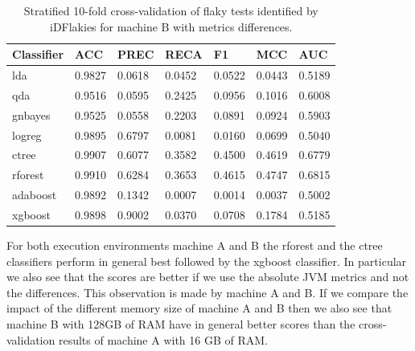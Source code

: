 \documentclass{seal_thesis}
\begin{document}
\begin{table}[ht]
\centering
\begin{tabular}{|l|l|l|l|l|l|l|}
\hline
\textbf{Classifier} & \textbf{ACC} & \textbf{PREC} & \textbf{RECA} & \textbf{F1} & \textbf{MCC} & \textbf{AUC} \\ \hline
  lda & 0.9827 & 0.0618 & 0.0452 & 0.0522 & 0.0443 & 0.5189 \\ \hline
  qda & 0.9516 & 0.0595 & 0.2425 & 0.0956 & 0.1016 & 0.6008 \\ \hline
  gnbayes & 0.9525 & 0.0558 & 0.2203 & 0.0891 & 0.0924 & 0.5903 \\ \hline
  logreg & 0.9895 & 0.6797 & 0.0081 & 0.0160 & 0.0699 & 0.5040 \\ \hline
  ctree & 0.9907 & 0.6077 & 0.3582 & 0.4500 & 0.4619 & 0.6779 \\ \hline
  rforest & 0.9910 & 0.6284 & 0.3653 & 0.4615 & 0.4747 & 0.6815 \\ \hline
  adaboost & 0.9892 & 0.1342 & 0.0007 & 0.0014 & 0.0037 & 0.5002 \\ \hline
  xgboost & 0.9898 & 0.9002 & 0.0370 & 0.0708 & 0.1784 & 0.5185 \\ \hline
\end{tabular}
\caption{Stratified 10-fold cross-validation of flaky tests identified by iDFlakies for machine B with metrics differences.}
\label{tab:cvmachineBidflakiesDiff}
\end{table}

\noindent For both execution environments machine A and B the rforest and the ctree classifiers perform in general best followed by the xgboost classifier. In particular we also see that the scores are better if we use the absolute JVM metrics and not the differences. This observation is made by machine A and B. If we compare the impact of the different memory size of machine A and B then we also see that machine B with 128GB of RAM have in general better scores than the cross-validation results of machine A with 16 GB of RAM. 
\end{document}
